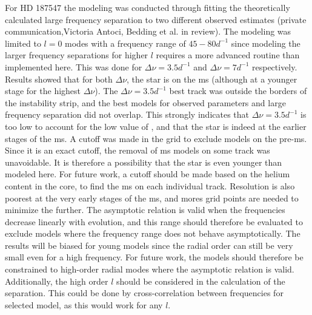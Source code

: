For HD 187547 the modeling was conducted through fitting the theoretically calculated large frequency separation to two different observed estimates \citet{antoci2011excitation} (private communication,Victoria Antoci, Bedding et al. in review). The modeling was limited to $l=0$ modes with a frequency range of $45-80 d^{-1}$ since modeling the larger frequency separations for higher $l$ requires a more advanced routine than implemented here. This was done for $\Delta\nu = 3.5 d^{-1}$ and $\Delta\nu = 7 d^{-1}$ respectively. Results showed that for both $\Delta\nu$, the star is on the ms (although at a younger stage for the highest $\Delta\nu$). The  $\Delta\nu = 3.5 d^{-1}$ best track was outside the borders of the instability strip, and the best models \chis for observed parameters and large frequency separation did not overlap. This strongly indicates that $\Delta\nu = 3.5 d^{-1}$ is too low to account for the low value of \lum, and that the star is indeed at the earlier stages of the ms. A cutoff was made in the grid to exclude models on the pre-ms. Since it is an exact cutoff,  the removal of ms models on some track was unavoidable. It is therefore a possibility that the star is even younger than modeled here. For future work, a cutoff should be made based on the helium content in the core, to find the ms on each individual track. Resolution is also poorest at the very early stages of the ms, and mores grid points are needed to minimize the \chis further. 
The asymptotic relation is valid when the frequencies decrease linearly with evolution, and this range should therefore be evaluated to exclude models where the frequency range does not behave asymptotically. The results will be biased for young models since the radial order can still be very small even for a high frequency. For future work, the models should therefore be constrained to high-order radial modes where the asymptotic relation is valid. Additionally, the high order $l$ should be considered in the calculation of the separation. This could be done by cross-correlation between frequencies for selected model, as this would work for any $l$. 

